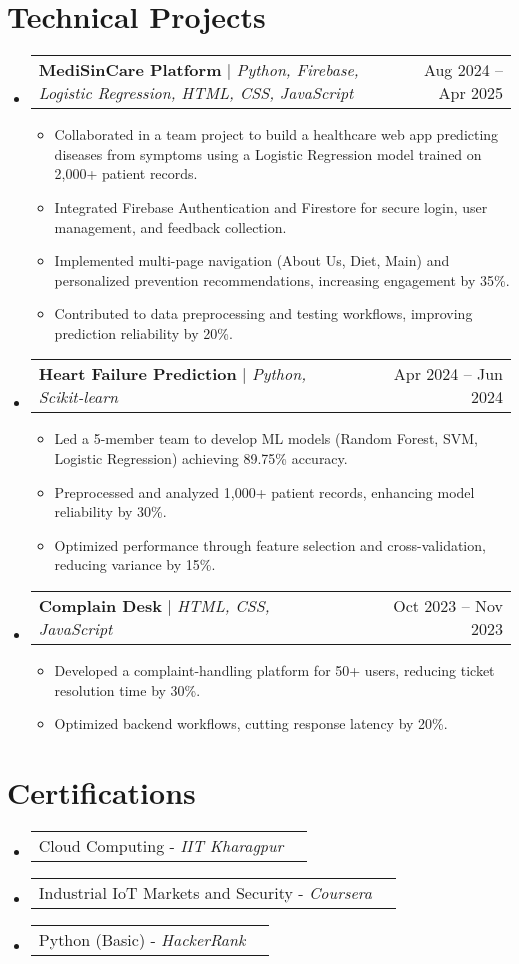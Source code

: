 \documentclass[letterpaper,10pt]{article}
\makeatletter
\newcommand{\resumeItem}[1]{
  \item\small{
    {#1 \vspace{-2pt}}
  }
}
\newcommand{\resumeProjectHeading}[2]{
    \item
    \begin{tabular*}{0.97\textwidth}{l@{\extracolsep{\fill}}r}
      \small#1 & #2 \\
    \end{tabular*}\vspace{-7pt}
}
\newcommand{\resumeSubHeadingListStart}{\begin{itemize}[leftmargin=0.15in, label={}]}
\newcommand{\resumeSubHeadingListEnd}{\end{itemize}}
\newcommand{\resumeItemListStart}{\begin{itemize}}
\newcommand{\resumeItemListEnd}{\end{itemize}\vspace{-5pt}}
\makeatother
\begin{document}
\section{Technical Projects}
\resumeSubHeadingListStart

\resumeProjectHeading
  {\textbf{MediSinCare Platform} $|$ \emph{Python, Firebase, Logistic Regression, HTML, CSS, JavaScript}}{Aug 2024 – Apr 2025}
  \resumeItemListStart
    \resumeItem{Collaborated in a team project to build a healthcare web app predicting diseases from symptoms using a Logistic Regression model trained on 2,000+ patient records.}
    \resumeItem{Integrated Firebase Authentication and Firestore for secure login, user management, and feedback collection.}
    \resumeItem{Implemented multi-page navigation (About Us, Diet, Main) and personalized prevention recommendations, increasing engagement by 35\%.}
    \resumeItem{Contributed to data preprocessing and testing workflows, improving prediction reliability by 20\%.}
  \resumeItemListEnd

\resumeProjectHeading
  {\textbf{Heart Failure Prediction} $|$ \emph{Python, Scikit-learn}}{Apr 2024 – Jun 2024}
  \resumeItemListStart
    \resumeItem{Led a 5-member team to develop ML models (Random Forest, SVM, Logistic Regression) achieving 89.75\% accuracy.}
    \resumeItem{Preprocessed and analyzed 1,000+ patient records, enhancing model reliability by 30\%.}
    \resumeItem{Optimized performance through feature selection and cross-validation, reducing variance by 15\%.}
  \resumeItemListEnd

\resumeProjectHeading
  {\textbf{Complain Desk} $|$ \emph{HTML, CSS, JavaScript}}{Oct 2023 – Nov 2023}
  \resumeItemListStart
    \resumeItem{Developed a complaint-handling platform for 50+ users, reducing ticket resolution time by 30\%.}
    \resumeItem{Optimized backend workflows, cutting response latency by 20\%.}
  \resumeItemListEnd

\resumeSubHeadingListEnd

\section{Certifications}
\resumeSubHeadingListStart
  \resumeProjectHeading
    {{Cloud Computing} - \emph{IIT Kharagpur}}{}
  \resumeProjectHeading
    {{Industrial IoT Markets and Security} - \emph{Coursera}}{}
  \resumeProjectHeading
    {{Python (Basic)} - \emph{HackerRank}}{}
\resumeSubHeadingListEnd
\end{document}

